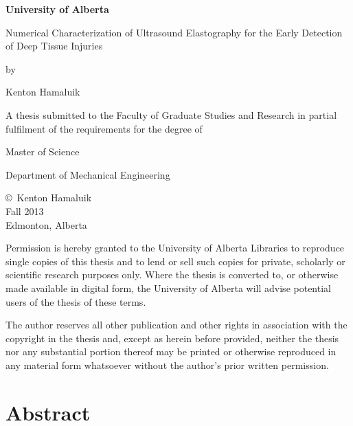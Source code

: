 \documentclass[12pt]{book}
\begin{document}
	\begin{center}

	{\fontsize{14pt}{1em}\selectfont \textbf{University of Alberta}}
	\vspace{3em}

	{\fontsize{13pt}{1em}\selectfont Numerical Characterization of Ultrasound Elastography for the Early Detection of Deep Tissue Injuries}
	\vspace{2em}

	{\fontsize{10pt}{1em} by}
	\vspace{1em}

	{\fontsize{13pt}{1em} Kenton Hamaluik}
	\vspace{5em}

	{\fontsize{11pt}{1em} A thesis submitted to the Faculty of Graduate Studies and Research in partial fulfilment of the requirements for the degree of}
	\vspace{3em}

	{\fontsize{13pt}{1em} Master of Science}
	\vspace{4em}

	{\fontsize{13pt}{1em} Department of Mechanical Engineering}
	\vspace{5em}

	{\fontsize{11pt}{1em}\copyright\ Kenton Hamaluik \\
	Fall 2013 \\
	Edmonton, Alberta}
	\vfill

	{\fontsize{9pt}{1em} Permission is hereby granted to the University of Alberta Libraries to reproduce single copies of this thesis and to lend or sell such copies for private, scholarly or scientific research purposes only. Where the thesis is converted to, or otherwise made available in digital form, the University of Alberta will advise potential users of the thesis of these terms.
	\vspace{1em}

	The author reserves all other publication and other rights in association with the copyright in the thesis and, except as herein before provided, neither the thesis nor any substantial portion thereof may be printed or otherwise reproduced in any material form whatsoever without the author's prior written permission.}
	\end{center}

\chapter*{\centering Abstract}
	\doublespacing
\end{document}
